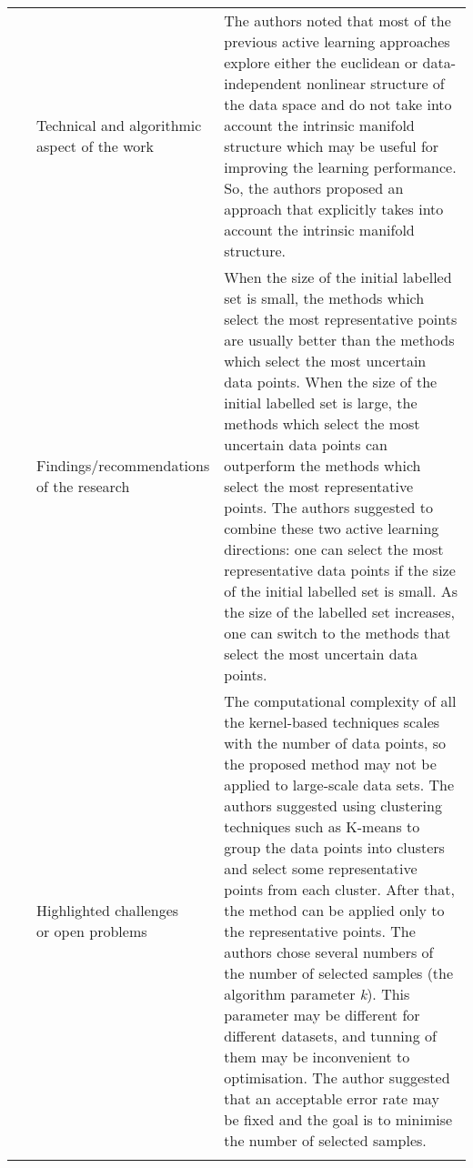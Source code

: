 \begin{landscape}
\begin{longtable}{lp{}p{}}
    \multirow{3}[0]{*}{~\citep{Cai2012}} & 
    \specialcell{Technical and algorithmic \\ aspect of the work} &
    The authors noted that most of the previous active learning approaches explore either the euclidean or data-independent nonlinear structure of the data space and do not take into account the intrinsic manifold structure which may be useful for improving the learning performance. So, the authors proposed an approach that explicitly takes into account the intrinsic manifold structure. 
    \\ & 
    \specialcell{Findings/recommendations \\ of the research} & 
    When the size of the initial labelled set is small, the methods which select the most representative points are usually better than the methods which select the most uncertain data points. When the size of the initial labelled set is large, the methods which select the most uncertain data points can outperform the methods which select the most representative points. The authors suggested to combine these two active learning directions: one can select the most representative data points if the size of the initial labelled set is small. As the size of the labelled set increases, one can switch to the methods that select the most uncertain data points. 
    \\ & 
    \specialcell{Highlighted challenges \\ or open problems} & 
    The computational complexity of all the kernel-based techniques scales with the number of data points, so the proposed method may not be applied to large-scale data sets. The authors suggested using clustering techniques such as K-means to group the data points into clusters and select some representative points from each cluster. After that, the method can be applied only to the representative points. The authors chose several numbers of the number of selected samples (the algorithm parameter \textit{k}). This parameter may be different for different datasets, and tunning of them may be inconvenient to optimisation. The author suggested that an acceptable error rate may be fixed and the goal is to minimise the number of selected samples. 
	\\
    
    \hline
     \label{tab:lm}
    \end{longtable}%
\end{landscape}